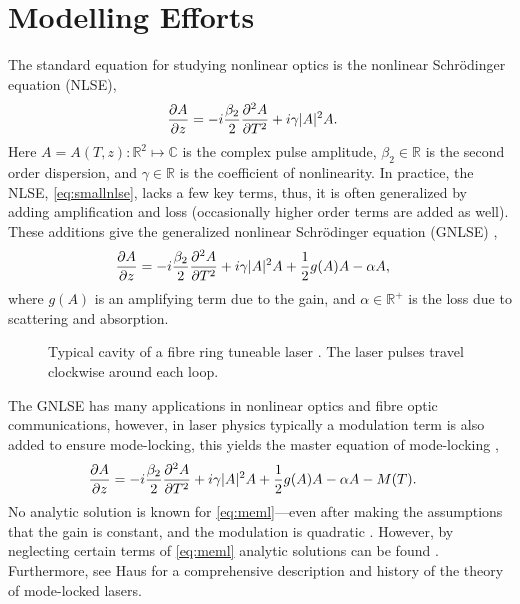 \documentclass[10pt,twocolumn,a4paper]{article}
\newcommand{\pdiff}[3][\hspace{-0.5pt}]{\frac{\partial^{#1}#2}{\partial{#3}^{#1}}}
\begin{document}
\section{Modelling Efforts}
\label{sec:modelling}
The standard equation for studying nonlinear optics is the nonlinear Schr\"odinger equation (NLSE),
\begin{align}
	\pdiff{A}{z} &= - i \frac{\beta_2}{2}\pdiff[2]{A}{T} + i \gamma |A|^2 A.
	\label{eq:smallnlse}
\end{align}
Here $A = A(T, z) : \mathbb{R}^2 \mapsto \mathbb{C}$ is the complex pulse amplitude, $\beta_2 \in \mathbb{R}$ is the second order dispersion, and $\gamma \in \mathbb{R}$ is the coefficient of nonlinearity. In practice, the NLSE, \eqref{eq:smallnlse}, lacks a few key terms, thus, it is often generalized by adding amplification and loss (occasionally higher order terms are added as well). These additions give the generalized nonlinear Schr\"{o}dinger equation (GNLSE) \cite{agrawal2013, bohun2015, finot2008, peng2018, shtyrina2017, yarutkina2013},
	\begin{align}
	\pdiff{A}{z} &= - i \frac{\beta_2}{2}\pdiff[2]{A}{T} + i \gamma |A|^2 A + \frac{1}{2}g(A) A - \alpha A,
	\label{eq:nlse}
\end{align}
where $g(A)$ is an amplifying term due to the gain, and $\alpha \in \mathbb{R}^+$ is the loss due to scattering and absorption.

\begin{figure}[tbp]
	\centering
	
	\caption{Typical cavity of a fibre ring tuneable laser \cite{burgoyne2014, chung2017, lapre2019, shao2019, tang2014}. The laser pulses travel clockwise around each loop.}
	\label{fig:cavity}
\end{figure}

The GNLSE has many applications in nonlinear optics and fibre optic communications, however, in laser physics typically a modulation term is also added to ensure mode-locking, this yields the master equation of mode-locking \cite{haus1984, haus1975, haus1986, haus1992, haus2000, tamura1996, usechak2005},
\begin{align}
	\pdiff{A}{z} &= - i \frac{\beta_2}{2}\pdiff[2]{A}{T} + i \gamma |A|^2 A + \frac{1}{2}g(A) A - \alpha A - M(T).
	\label{eq:meml}
\end{align}
No analytic solution is known for \eqref{eq:meml}---even after making the assumptions that the gain is constant, and the modulation is quadratic \cite{haus1984, haus1975, haus1996}. However, by neglecting certain terms of \eqref{eq:meml} analytic solutions can be found \cite{burgoyne2014, haus1975, haus1986, haus1991, haus1992, haus1996, tamura1996, usechak2005}. Furthermore, see Haus \cite{haus2000} for a comprehensive description and history of the theory of mode-locked lasers.
\end{document}
